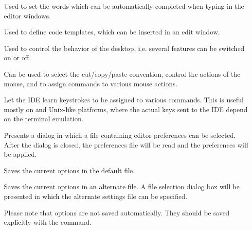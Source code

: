 \begin{description}
\begin{description}
Used to set the words which can be automatically completed when typing in
the editor windows.
\item[Codetemplates]
Used to define code templates, which can be inserted in an edit window.
\item[Desktop]
Used to control the behavior of the desktop, i.e. several features can be
switched on or off.
\item[Keyboard \& Mouse] Can be used to select the cut/copy/paste
convention, control the actions of the mouse, and to assign commands 
to various mouse actions.
\item[Learn keys] Let the IDE learn keystrokes to be assigned to various 
commands. This is useful mostly on \linux and Unix-like platforms, where the
actual keys sent to the IDE depend on the terminal emulation.
\end{description}
\item[Open]
Presents a dialog in which a file containing editor preferences can be selected.
After the dialog is closed, the preferences file will be read and the
preferences will be applied.
\item[Save]
Saves the current options in the default file.
\item[Save as]
Saves the current options in an alternate file. A file selection dialog box
will be presented in which the alternate settings file can be specified.
\end{description}
Please note that options are not saved automatically. They should be saved
explicitly with the  command.
%
%
